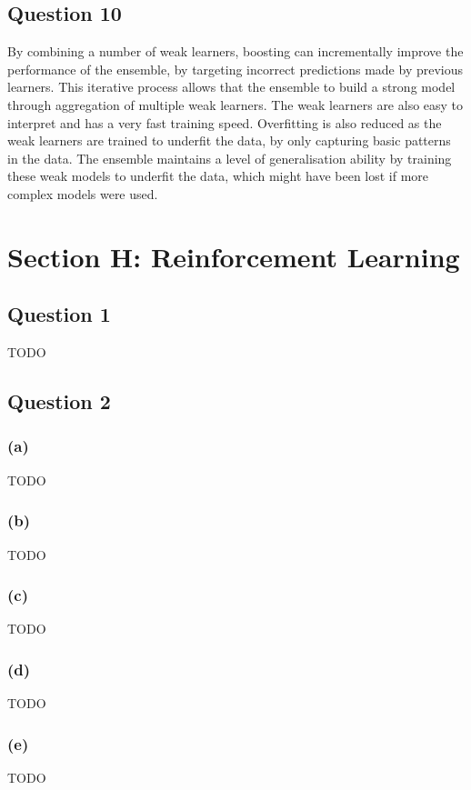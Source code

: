 \documentclass[10pt]{article}
\begin{document}
\subsection*{Question 10}

By combining a number of weak learners, boosting can incrementally improve the performance of
the ensemble, by targeting incorrect predictions made by previous learners. This iterative process
allows that the ensemble to build a strong model through aggregation of multiple weak learners.
The weak learners are also easy to interpret and has a very fast training speed. Overfitting is also
reduced as the weak learners are trained to underfit the data, by only capturing basic patterns in the data.
The ensemble maintains a level of generalisation ability by training these weak models to underfit the data, which
might have been lost if more complex models were used.

\section*{Section H: Reinforcement Learning}

\subsection*{Question 1}

TODO

\subsection*{Question 2}

\subsubsection*{(a)}

TODO

\subsubsection*{(b)}

TODO

\subsubsection*{(c)}

TODO

\subsubsection*{(d)}

TODO

\subsubsection*{(e)}

TODO

 

\end{document}
